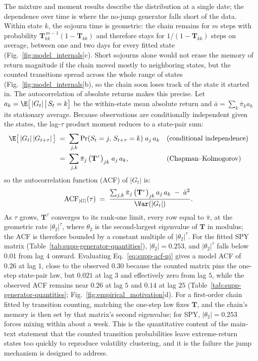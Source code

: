 The mixture and moment results describe the distribution at a single
date; the dependence over time is where the no-jump generator falls
short of the data. Within state $k$, the sojourn time is geometric:
the chain remains for $m$ steps with probability
$\mathbf{T}_{kk}^{\,m-1} (1 - \mathbf{T}_{kk})$ and therefore stays
for $1/(1 - \mathbf{T}_{kk})$ steps on average, between one and two
days for every fitted state
(Fig.~\ref{fig:model_internals}c). Short sojourns alone would not
erase the memory of return magnitude if the chain moved mostly to
neighboring states, but the counted transitions spread across the
whole range of states (Fig.~\ref{fig:model_internals}b), so the chain
soon loses track of the state it started in. The autocorrelation of
absolute returns makes this precise. Let $a_k =
\E\big[\,|G_t| \,\big|\, S_t = k\big]$ be the within-state mean
absolute return and $\bar a = \sum_k \bar\pi_k a_k$ its stationary
average. Because observations are conditionally independent given the
states, the lag-$\tau$ product moment reduces to a state-pair sum:
\begin{align}
  \E\big[\,|G_t|\, |G_{t+\tau}|\,\big]
   &\;=\; \sum_{j, k}
     \Pr(S_t = j,\, S_{t+\tau} = k)\; a_j\, a_k
     && \text{(conditional independence)} \notag \\
   &\;=\; \sum_{j, k} \bar\pi_j\,
     \big(\mathbf{T}^\tau\big)_{jk}\; a_j\, a_k,
     && \text{(Chapman--Kolmogorov)}
  \label{eq:supp-acf-nj}
\end{align}
so the autocorrelation function (ACF) of $|G_t|$ is:
\begin{equation}
  \mathrm{ACF}_{|G|}(\tau)
  \;=\; \frac{\sum_{j, k} \bar\pi_j\,
    \big(\mathbf{T}^\tau\big)_{jk}\, a_j\, a_k \;-\; \bar a^2}
    {\Var(|G_t|)}.
  \label{eq:supp-acf-nj-def}
\end{equation}
As $\tau$ grows, $\mathbf{T}^\tau$ converges
to its rank-one limit, every row equal to $\bar\pi$, at the geometric
rate $|\theta_2|^\tau$, where $\theta_2$ is the second-largest
eigenvalue of $\mathbf{T}$ in modulus; the ACF is therefore bounded
by a constant multiple of $|\theta_2|^\tau$. For the fitted SPY
matrix (Table~\ref{tab:supp-generator-quantities}), $|\theta_2| = 0.253$, and $|\theta_2|^\tau$ falls below
$0.01$ from lag $4$ onward. Evaluating Eq.~\eqref{eq:supp-acf-nj}
gives a model ACF of $0.26$ at lag $1$, close to the observed $0.30$
because the counted matrix pins the one-step state-pair law, but
$0.021$ at lag $3$ and effectively zero from lag $5$, while the
observed ACF remains near $0.26$ at lag $5$ and $0.14$ at lag $25$
(Table~\ref{tab:supp-generator-quantities};
Fig.~\ref{fig:empirical_motivation}d). For a first-order chain fitted
by transition counting, matching the one-step law fixes $\mathbf{T}$,
and the chain's memory is then set by that matrix's second
eigenvalue; for SPY, $|\theta_2| = 0.253$ forces mixing within about
a week. This is the quantitative content of the main-text statement
that the counted transition probabilities leave extreme-return states
too quickly to reproduce volatility clustering, and it is the failure
the jump mechanism is designed to address.

